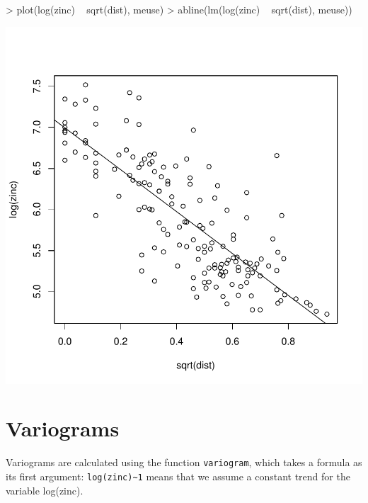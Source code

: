 \documentclass[a4paper]{article}
\newcommand{\code}[1]{{\tt #1}}
\begin{document}
\begin{Schunk}
\begin{Sinput}
> plot(log(zinc) ~ sqrt(dist), meuse)
> abline(lm(log(zinc) ~ sqrt(dist), meuse))
\end{Sinput}
\end{Schunk}
\includegraphics{gstat-005}

\section{Variograms }

Variograms are calculated using the function \code{variogram}, which
takes a formula as its first argument: \verb|log(zinc)~1| means that we
assume a constant trend for the variable log(zinc).
\end{document}
